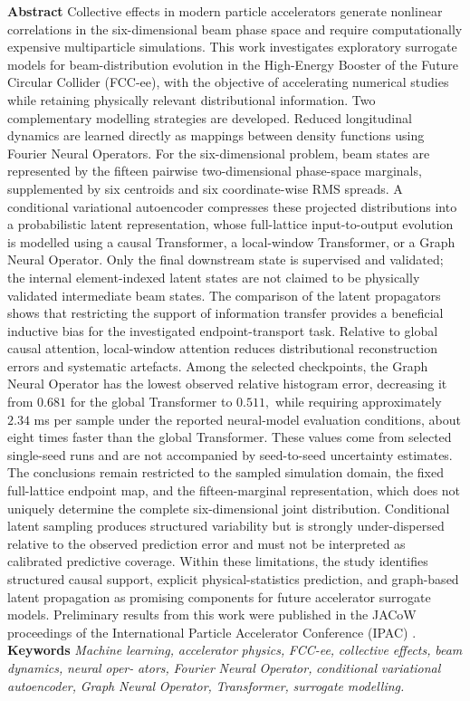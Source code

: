 \textbf{Abstract} Collective effects in modern particle accelerators generate nonlinear correlations in the six-dimensional beam phase space and require computationally expensive multiparticle simulations. This work investigates exploratory surrogate models for beam-distribution evolution in the High-Energy Booster of the Future Circular Collider (FCC-ee), with the objective of accelerating numerical studies while retaining physically relevant distributional information. Two complementary modelling strategies are developed. Reduced longitudinal dynamics are learned directly as mappings between density functions using Fourier Neural Operators. For the six-dimensional problem, beam states are represented by the fifteen pairwise two-dimensional phase-space marginals, supplemented by six centroids and six coordinate-wise RMS spreads. A conditional variational autoencoder compresses these projected distributions into a probabilistic latent representation, whose full-lattice input-to-output evolution is modelled using a causal Transformer, a local-window Transformer, or a Graph Neural Operator. Only the final downstream state is supervised and validated; the internal element-indexed latent states are not claimed to be physically validated intermediate beam states. The comparison of the latent propagators shows that restricting the support of information transfer provides a beneficial inductive bias for the investigated endpoint-transport task. Relative to global causal attention, local-window attention reduces distributional reconstruction errors and systematic artefacts. Among the selected checkpoints, the Graph Neural Operator has the lowest observed relative histogram error, decreasing it from \(0.681\) for the global Transformer to \(0.511 ,\) while requiring approximately \(2.34\) ms per sample under the reported neural-model evaluation conditions, about eight times faster than the global Transformer. These values come from selected single-seed runs and are not accompanied by seed-to-seed uncertainty estimates. The conclusions remain restricted to the sampled simulation domain, the fixed full-lattice endpoint map, and the fifteen-marginal representation, which does not uniquely determine the complete six-dimensional joint distribution. Conditional latent sampling produces structured variability but is strongly under-dispersed relative to the observed prediction error and must not be interpreted as calibrated predictive coverage. Within these limitations, the study identifies structured causal support, explicit physical-statistics prediction, and graph-based latent propagation as promising components for future accelerator surrogate models. Preliminary results from this work were published in the JACoW proceedings of the International Particle Accelerator Conference (IPAC) \cite{ghribi2026updates}. \textbf{Keywords} \emph{Machine} \emph{learning,} \emph{accelerator} \emph{physics,} \emph{FCC-ee,} \emph{collective} \emph{effects,} \emph{beam} \emph{dynamics,} \emph{neural} \emph{oper-} \emph{ators,} \emph{Fourier} \emph{Neural} \emph{Operator,} \emph{conditional} \emph{variational} \emph{autoencoder,} \emph{Graph} \emph{Neural} \emph{Operator,} \emph{Transformer,} \emph{surrogate} \emph{modelling.}
